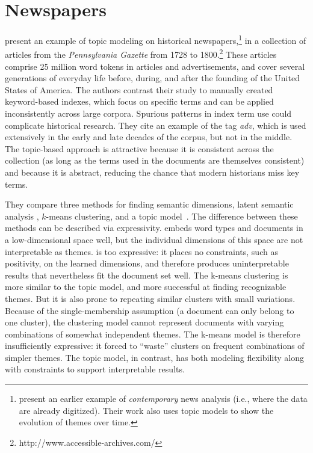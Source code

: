 
\section{Newspapers}

\citet{newman-06} present an example of topic modeling on historical newspapers,\footnote{\citet{mei-05} present an earlier example of \emph{contemporary} news analysis (i.e., where the data are already digitized).  Their work also uses topic models to show the evolution of themes over time.} in a collection of articles from the {\em Pennsylvania Gazette} from 1728 to 1800.\footnote{http://www.accessible-archives.com/}
These articles comprise 25 million word tokens in articles and advertisements, and cover several generations of everyday life before, during, and after the founding of the United States of America.
The authors contrast their study to manually created keyword-based indexes, which focus on specific terms and can be applied inconsistently across large corpora.
Spurious patterns in index term use could complicate historical research.
They cite an example of the tag {\em adv}, which is used extensively in the early and late decades of the corpus, but not in the middle.
The topic-based approach is attractive because it is consistent across the collection (as long as the terms used in the documents are themselves consistent) and because it is abstract, reducing the chance that modern historians miss key terms.

They compare three methods for finding semantic dimensions, latent semantic analysis \citep{deerwester-90}, $k$-means clustering, and a topic model~\citep{hofmann-99}.
The difference between these methods can be described via expressivity.
 embeds word types and documents in a low-dimensional space well, but the individual dimensions of this space are not interpretable as themes.
 is too expressive: it places no constraints, such as positivity, on the learned dimensions, and therefore produces uninterpretable results that nevertheless fit the document set well.
The k-means clustering is more similar to the topic model, and more successful at finding recognizable themes.
But it is also prone to repeating similar clusters with small variations.
Because of the single-membership assumption (a document can only belong to one cluster), the clustering model cannot represent documents with varying combinations of somewhat independent themes.
The k-means model is therefore insufficiently expressive: it forced to ``waste'' clusters on frequent combinations of simpler themes.
The topic model, in contrast, has both modeling flexibility along with constraints to support interpretable results.


